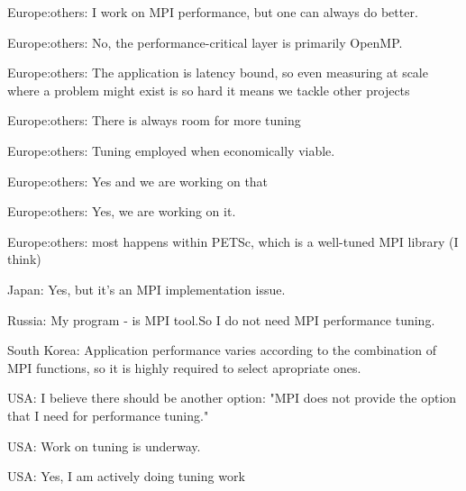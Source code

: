 \item Europe:others: I work on MPI performance, but one can always do better.
\item Europe:others: No, the performance-critical layer is primarily OpenMP.
\item Europe:others: The application is latency bound, so even measuring at scale where a problem might exist is so hard it means we tackle other projects
\item Europe:others: There is always room for more tuning
\item Europe:others: Tuning employed when economically viable.
\item Europe:others: Yes and we are working on that
\item Europe:others: Yes, we are working on it.
\item Europe:others: most happens within PETSc, which is a well-tuned MPI library (I think)
\item Japan: Yes, but it's an MPI implementation issue.
\item Russia: My program - is MPI tool.So I do not need MPI performance tuning.
\item South Korea: Application performance varies according to the combination of MPI functions, so it is highly required to select apropriate ones.
\item USA: I believe there should be another option: "MPI does not provide the option that I need for performance tuning."
\item USA: Work on tuning is underway.
\item USA: Yes, I am actively doing tuning work
